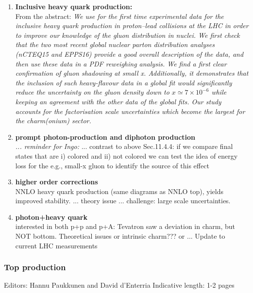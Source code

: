 \documentclass[../report.tex]{subfiles}
\begin{document}
\begin{enumerate}
\item 
\textbf{Inclusive heavy quark production:} \\
 From the abstract:\cite{Kusina:2018pbp}
{\it We use for the first time experimental data for the inclusive heavy quark
production in proton--lead collisions at the LHC in order to improve
our knowledge of the gluon distribution in nuclei. We first check that the
two most recent global nuclear parton distribution analyses (nCTEQ15
and EPPS16) provide a good overall description of the data, and then use
these data in a PDF reweighing analysis. We find a first clear confirmation
of gluon shadowing at small x. Additionally, it demonstrates that the
inclusion of such heavy-flavour data in a global fit would significantly reduce
the uncertainty on the gluon density down to 
$x \simeq 7 \times 10^{-6}$ while keeping
an agreement with the other data of the global fits. Our study accounts
for the factorisation scale uncertainties which become the largest for the
charm(onium) sector.}

\item 
\textbf{prompt photon-production and diphoton production } \\
{\it ... reminder for Ingo:} ... contrast to above Sec.11.4.4: 
if we compare final states that are i) colored and ii) not colored we can test the idea of energy loss
for the e.g., small-x gluon to identify the source of this effect

\item 
\textbf{higher order corrections} \\
 NNLO heavy quark production (same diagrams as NNLO top), yields improved stability. 
... theory issue ...
challenge: large scale uncertainties. 

\item
\textbf{photon+heavy quark}\cite{Stavreva:2010mw,Stavreva:2012aa}\\
interested in both p+p and p+A: 
Tevatron saw a deviation in charm, but NOT bottom. 
Theoretical issues or intrinsic charm??? or ...
Update to current LHC measurements 

\end{enumerate}


\subsubsection{Top production}
Editors: Hannu Paukkunen and David d'Enterria
Indicative length: 1-2 pages \\
\end{document}
